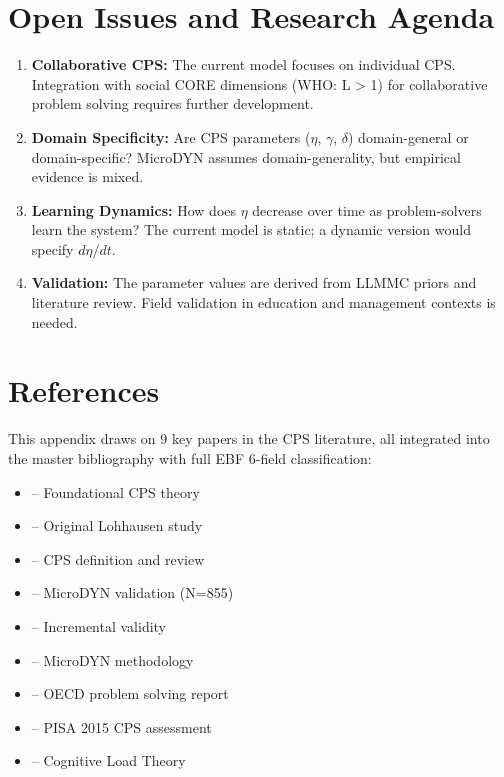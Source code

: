 \section{Open Issues and Research Agenda}
\label{sec:cps-open}

\begin{enumerate}
\item \textbf{Collaborative CPS:} The current model focuses on individual CPS. Integration with social CORE dimensions (WHO: L > 1) for collaborative problem solving requires further development.

\item \textbf{Domain Specificity:} Are CPS parameters ($\eta$, $\gamma$, $\delta$) domain-general or domain-specific? MicroDYN assumes domain-generality, but empirical evidence is mixed.

\item \textbf{Learning Dynamics:} How does $\eta$ decrease over time as problem-solvers learn the system? The current model is static; a dynamic version would specify $d\eta/dt$.

\item \textbf{Validation:} The parameter values are derived from LLMMC priors and literature review. Field validation in education and management contexts is needed.
\end{enumerate}



\section{References}
\label{sec:cps-references}

This appendix draws on 9 key papers in the CPS literature, all integrated into the master bibliography with full EBF 6-field classification:

\begin{itemize}[nosep]
\item \cite{PAP-doerner1989logik} -- Foundational CPS theory
\item \cite{PAP-doerner1983lohhausen} -- Original Lohhausen study
\item \cite{PAP-funke2017cps} -- CPS definition and review
\item \cite{PAP-greiff2013cps} -- MicroDYN validation (N=855)
\item \cite{PAP-greiff2012microdynamvalidity} -- Incremental validity
\item \cite{PAP-greiff2017microdynamapproach} -- MicroDYN methodology
\item \cite{PAP-oecd2017problemsolving} -- OECD problem solving report
\item \cite{PAP-oecd2017pisa2015cps} -- PISA 2015 CPS assessment
\item \cite{PAP-sweller1988cognitiveload} -- Cognitive Load Theory
\end{itemize}

